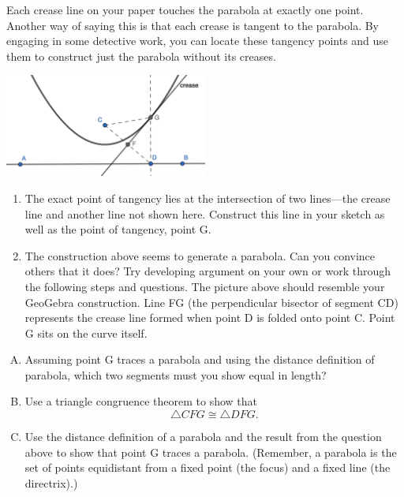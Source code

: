 \documentclass[11pt]{article}
\begin{document}
\smallskip

\noindent Each crease line on your paper touches the parabola at exactly one point. Another way of saying this is that each crease is tangent to the parabola. By engaging in some detective work, you can locate these tangency points and use them to construct just the parabola without its creases.




\begin{center}
\includegraphics[width=0.5\textwidth]{figure2.png}
\end{center}

\begin{enumerate}[(1)]

\item The exact point of tangency lies at the intersection of two lines—the crease line and another line not shown here. Construct this line in your sketch as well as the point of tangency, point G.

\item The construction above seems to generate a parabola. Can you convince others that it does? Try developing argument on your own or work through the following steps and questions. The picture above should resemble your GeoGebra construction. Line FG (the perpendicular bisector of segment CD) represents the crease line formed when point D is folded onto point C. Point G sits on the curve itself.
	
\end{enumerate}

\vspace{0.2 in}


\begin{enumerate}[(A)]
\item Assuming point G traces a parabola and using the distance definition of parabola, which two segments must you show equal in length?

\item Use a triangle congruence theorem to show that $$\triangle {CFG} \cong \triangle {DFG}.$$

\item Use the distance definition of a parabola and the result from the question above to show that point G traces a parabola. (Remember, a parabola is the set of points equidistant from a fixed point (the focus) and a fixed line (the directrix).)

\end{enumerate}
\end{document}

